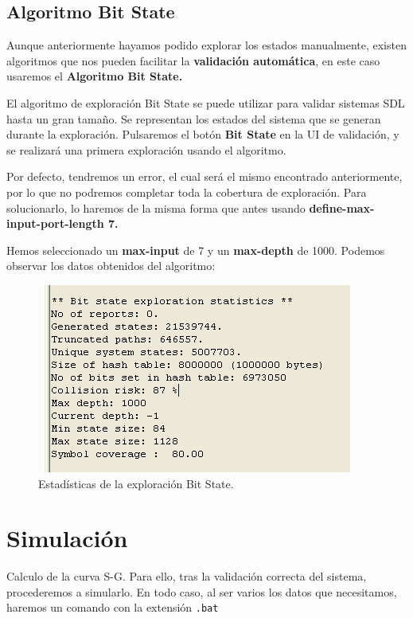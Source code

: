 \documentclass{article}
\begin{document}
\subsection{Algoritmo Bit State}

Aunque anteriormente hayamos podido explorar los estados manualmente, existen algoritmos que nos pueden facilitar la \textbf{validación automática}, en este caso usaremos el \textbf{Algoritmo Bit State.}

El algoritmo de exploración Bit State se puede utilizar para validar sistemas SDL hasta un gran tamaño. Se representan los estados del sistema que se generan durante la exploración. Pulsaremos el botón \textbf{Bit State} en la UI de validación, y se realizará una primera exploración usando el algoritmo.

\quad 

Por defecto, tendremos un error, el cual será el mismo encontrado anteriormente, por lo que no podremos completar toda la cobertura de exploración. Para solucionarlo, lo haremos de la misma forma que antes usando \textbf{define-max-input-port-length 7.}

Hemos seleccionado un \textbf{max-input} de 7 y un \textbf{max-depth} de 1000. Podemos observar los datos obtenidos del algoritmo:
 
\begin{figure}[ht]
    \centering
    \includegraphics[width=0.65\linewidth]{src/bit state.png}
    \caption{\label{fig:bitstate} Estadísticas de la exploración Bit State.}
\end{figure}

\newpage

\section{Simulación}

Calculo de la curva S-G. Para ello, tras la validación correcta del sistema, procederemos a simularlo. En todo caso, al ser varios los datos que necesitamos, haremos un comando con la extensión \verb|.bat|
\end{document}
